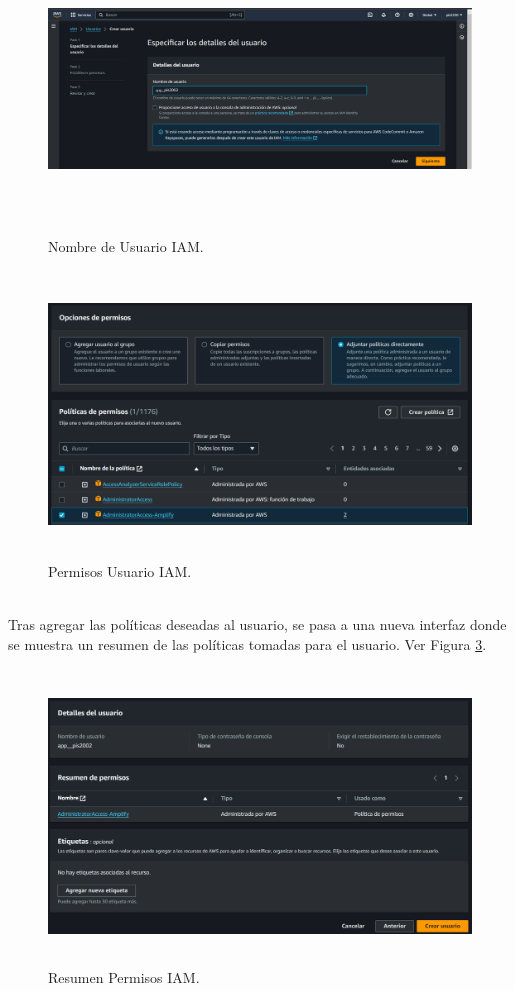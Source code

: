 \documentclass[a4paper,10pt, oneside, titlepage]{article}
\begin{document}
	\begin{figure}[!h]
		\centering
		\includegraphics[width = 1\linewidth, height = 7.6cm]{Nombre_Usuario.png}
		\caption{Nombre de Usuario IAM.}
		\label{Nombre_Usuario}
	\end{figure}
	\begin{figure}[!h]
		\centering
		\includegraphics[width = 1\linewidth, height = 7.6cm]{Permisos_Usuario_IAM.png}
		\caption{Permisos Usuario IAM.}
		\label{Permisos_Usuario_IAM}
	\end{figure} \\
	\indent Tras agregar las políticas deseadas al usuario, se pasa a una nueva interfaz donde se muestra un resumen de las políticas tomadas para el usuario. Ver Figura \ref{Resumen_Permisos_IAM}.
	\begin{figure}[!h]
		\centering
		\includegraphics[width = 1\linewidth, height = 7.8cm]{Resumen_Permisos_IAM.png}
		\caption{Resumen Permisos IAM.}
		\label{Resumen_Permisos_IAM}
	\end{figure} \\
\end{document}
